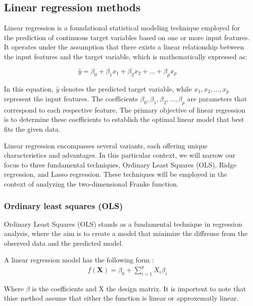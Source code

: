 \thispagestyle{plain}

\subsection{Linear regression methods}

\noindent Linear regression is a foundational statistical modeling technique employed for the prediction of continuous target variables
based on one or more input features. It operates under the assumption that there exists a linear relationship between the input features
and the target variable, which is mathematically expressed as:

\[
\hat{y} = \beta_0 + \beta_1 x_1 + \beta_2 x_2 + \ldots + \beta_p x_p
\]

In this equation, $\hat{y}$ denotes the predicted target variable, while $x_1, x_2, \ldots, x_p$ represent the input features. The 
coefficients $\beta_0, \beta_1, \beta_2, \ldots, \beta_p$ are parameters that correspond to each respective feature. The primary objective 
of linear regression is to determine these coefficients to establish the optimal linear model that best fits the given data.

Linear regression encompasses several variants, each offering unique characteristics and advantages. In this particular context, 
we will narrow our focus to three fundamental techniques, Ordinary Least Squares (OLS), Ridge regression, and Lasso regression. These 
techniques will be employed in the context of analyzing the two-dimensional Franke function. 


\subsubsection{Ordinary least squares (OLS)}
\noindent Ordinary Least Squares (OLS) stands as a fundamental technique in regression
analysis, where the aim is to create a model that minimize the diffrense from
the observed data and the predicted model. 


A linear regression model has the following form :
\begin{align}
    f(\textbf{X}) = \beta_0 + \sum^{p}_{i=1} X_i \beta_i \label{linear model} %
\end{align}

Where $\beta$ is the coefficients and X the design matrix. It is importent to note 
that thise method assume that either the function is linear or approxematly linear.



